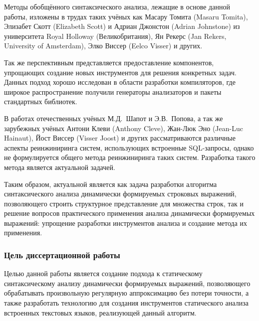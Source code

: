 Методы обобщённого синтаксического анализа, лежащие в основе данной работы, изложены в трудах таких учёных как Масару Томита (Masaru Tomita), Элизабет Скотт (Elizabeth Scott) и Адриан Джонстон (Adrian Johnstone) из университета Royal Holloway (Великобритания), Ян Рекерс (Jan Rekers, University of Amsterdam), Элко Виссер (Eelco Visser) и других.

Так же перспективным представляется предоставление компонентов, упрощающих создание новых инструментов для решения конкретных задач. Данных подход хорошо исследован в области разработки компиляторов, где широкое распространение получили генераторы анализаторов и пакеты стандартных библиотек. 

В работах отечественных учёных М.Д.~Шапот  и Э.В.~Попова, а так же зарубежных учёных Антони Клеви (Anthony Cleve), Жан-Люк Эно (Jean-Luc Hainaut), Йост Виссер (Visser Joost) и других рассматриваются различные аспекты реинжиниринга систем, использующих встроенные SQL-запросы, однако не формулируется общего метода реинжиниринга таких систем. Разработка такого метода является актуальной задачей.

Таким образом, актуальной является как задача разработки алгоритма синтаксического анализа динамически формируемых строковых выражений, позволяющего строить структурное представление для множества строк, так и решение вопросов практического применения анализа динамически формируемых выражений: упрощение разработки инструментов анализа и создание метода их применения.

\subsubsection*{\large{Цель диссертационной работы}}

Целью данной работы является создание подхода к статическому синтаксическому анализу динамически формируемых выражений, позволяющего обрабатывать произвольную регулярную аппроксимацию без потери точности, а также разработать технологию для создания инструментов статического анализа встроенных текстовых языков, реализующей данный алгоритм.

